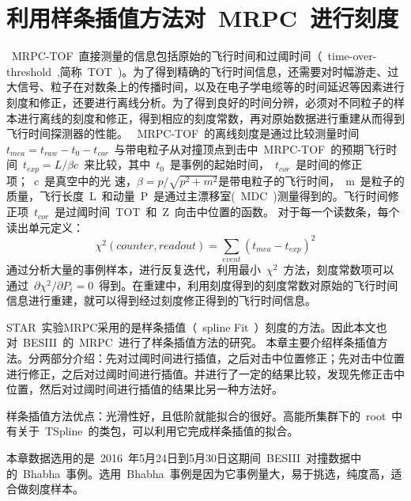 \chapter{利用样条插值方法对~MRPC~进行刻度}

~MRPC-TOF~直接测量的信息包括原始的飞行时间和过阈时间（~time-over-threshold~,简称~TOT~)。为了得到精确的飞行时间信息，还需要对时幅游走、过大信号、粒子在对数条上的传播时间，以及在电子学电缆等的时间延迟等因素进行刻度和修正，还要进行离线分析。为了得到良好的时间分辨，必须对不同粒子的样本进行离线的刻度和修正，得到相应的刻度常数，再对原始数据进行重建从而得到飞行时间探测器的性能。
~MRPC-TOF~的离线刻度是通过比较测量时间~$t_{mea}=t_{raw}-t_{0}-t_{cor}$~与带电粒子从对撞顶点到击中~MRPC-TOF~的预期飞行时间~$t_{exp}=L/\beta c$~来比较，其中~$t_{0}$~是事例的起始时间，~$t_{cor}$~是时间的修正项；~c~是真空中的光
速，$\beta=p/\sqrt{p^2+m^2}$是带电粒子的飞行时间，~m~是粒子的质量，飞行长度~L~和动量~P~是通过主漂移室(~MDC~)测量得到的。飞行时间修正项~$t_{cor}$~是过阈时间~TOT~和~Z~向击中位置的函数。
对于每一个读数条，每个读出单元定义：
\begin{displaymath}
\chi^2(counter,readout)=\sum\limits_{event}(t_{mea}-t_{exp})^2
\end{displaymath}
通过分析大量的事例样本，进行反复迭代，利用最小~$\chi^2$~方法，刻度常数项可以通过~$\partial\chi^2/\partial P_{i}=0$~得到。在重建中，利用刻度得到的刻度常数对原始的飞行时间信息进行重建，就可以得到经过刻度修正得到的飞行时间信息。

STAR~实验MRPC采用的是样条插值（~spline Fit~）刻度的方法。因此本文也对~BESIII~的~MRPC~进行了样条插值方法的研究。
本章主要介绍样条插值方法。分两部分介绍：先对过阈时间进行插值，之后对击中位置修正；先对击中位置进行修正，之后对过阈时间进行插值。并进行了一定的结果比较，发现先修正击中位置，然后对过阈时间进行插值的结果比另一种方法好。

样条插值方法优点：光滑性好，且低阶就能拟合的很好。高能所集群下的~root~中有关于~TSpline~的类包，可以利用它完成样条插值的拟合。

本章数据选用的是~2016~年5月24日到5月30日这期间~BESIII~对撞数据中的~Bhabha~事例。选用~Bhabha~事例是因为它事例量大，易于挑选，纯度高，适合做刻度样本。

